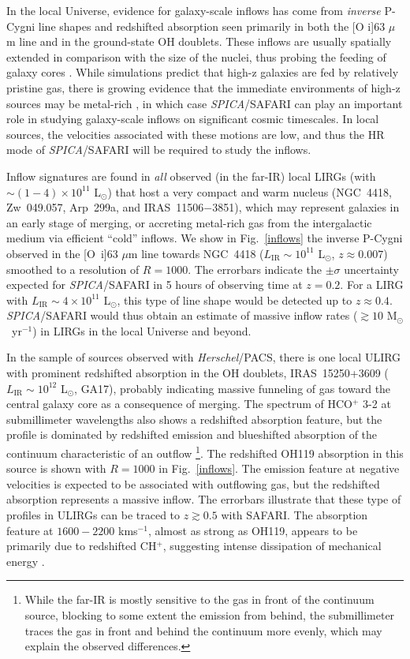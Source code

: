 \documentclass{pasa}%
\newcommand{\kms}{{\hbox {km\thinspace s$^{-1}$}}}
\newcommand{\Lsun}{{\hbox {L$_\odot$}}}
\newcommand{\Msun}{{\hbox {M$_\odot$}}}
\begin{document}
In the local Universe, evidence for galaxy-scale inflows has come from 
{\it inverse} P-Cygni line shapes and redshifted absorption seen primarily in
both the [O {\sc i}]63 $\mu$m line and in the ground-state OH doublets. 
These inflows are usually spatially extended in comparison with the size of
the nuclei, thus probing the feeding of galaxy cores
\citep[GA12, GA17]{fal15,fal17}. 
While simulations predict that high-z galaxies are fed by relatively
  pristine gas, there is growing evidence that the immediate environments of
  high-z sources may be metal-rich \citep{pro14,emo16,nee17}, in which case
  {\it SPICA}/SAFARI can play an important role in studying 
  galaxy-scale inflows on significant cosmic timescales.
In local sources, the velocities associated with these motions are low,
and thus the HR mode of {\it SPICA}/SAFARI will be required to study the
  inflows. 


Inflow signatures are found in {\it all} observed (in the far-IR) local LIRGs
(with $\sim(1-4)\times10^{11}$ \Lsun) that host a very compact and warm
nucleus (NGC~4418, Zw~049.057, Arp~299a, and IRAS~11506$-$3851), which 
may represent galaxies in an early stage of merging, or accreting
metal-rich gas from the intergalactic medium via efficient ``cold''
inflows. We show in Fig.~\ref{inflows} the inverse P-Cygni observed in the
[O~{\sc i}]63 $\mu$m line towards NGC~4418 ($L_{\mathrm{IR}}\sim10^{11}$
\Lsun, $z\approx0.007$) smoothed to a resolution of $R=1000$. The errorbars
indicate the $\pm\sigma$ uncertainty expected for {\it SPICA}/SAFARI in 5
hours of observing time at $z=0.2$. For a LIRG with
$L_{\mathrm{IR}}\sim4\times10^{11}$ \Lsun, this type of line shape would be
detected up to $z\approx0.4$. {\it SPICA}/SAFARI would thus obtain an
estimate of massive inflow rates ($\gtrsim10$ \Msun\ yr$^{-1}$) in LIRGs in
the local Universe and beyond. 

In the sample of sources observed with {\it Herschel}/PACS, there is one local
ULIRG with prominent redshifted absorption in the OH doublets, IRAS~15250+3609
($L_{\mathrm{IR}}\sim10^{12}$ \Lsun, GA17), probably indicating massive
funneling of gas toward the central galaxy core as a consequence of merging.
The spectrum of HCO$^+$ 3-2 at submillimeter wavelengths also shows a
redshifted absorption feature, but the profile is dominated by redshifted
emission and blueshifted absorption of the continuum characteristic of an
outflow \citep{ima16}\footnote{While the far-IR is mostly sensitive to the
  gas in front of the continuum source, blocking to some extent the emission
  from behind, the submillimeter traces the gas in front and behind the
  continuum more evenly, which may explain the observed differences.}. 
The redshifted OH119 absorption in this source is shown with $R=1000$ in
Fig.~\ref{inflows}. The emission feature at negative velocities is expected to
be associated with outflowing gas, but the redshifted absorption represents a
massive inflow. The errorbars illustrate that these type of profiles in
ULIRGs can be traced to $z\gtrsim0.5$ with SAFARI. The
absorption feature at $1600-2200$ \kms, almost as strong as OH119, appears to
be primarily due to redshifted CH$^+$, suggesting intense dissipation of
mechanical energy \citep{falg15}. 
\end{document}
